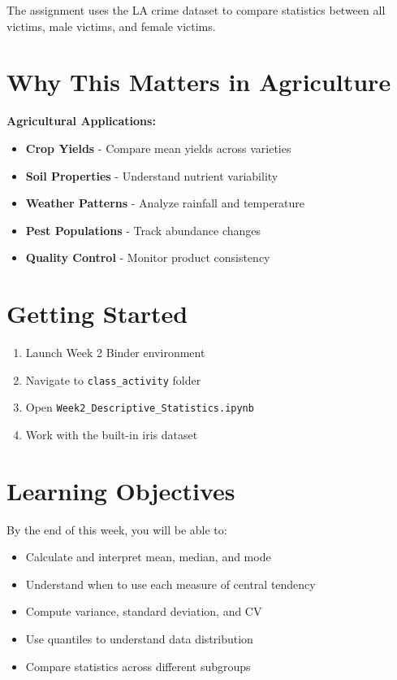 \documentclass[11pt,a4paper]{article}
\begin{document}
The assignment uses the LA crime dataset to compare statistics between all victims, male victims, and female victims.

\section{Why This Matters in Agriculture}

\begin{infobox}
\textbf{Agricultural Applications:}
\begin{itemize}
    \item \textbf{Crop Yields} - Compare mean yields across varieties
    \item \textbf{Soil Properties} - Understand nutrient variability
    \item \textbf{Weather Patterns} - Analyze rainfall and temperature
    \item \textbf{Pest Populations} - Track abundance changes
    \item \textbf{Quality Control} - Monitor product consistency
\end{itemize}
\end{infobox}

\section{Getting Started}

\begin{enumerate}
    \item Launch Week 2 Binder environment
    \item Navigate to \texttt{class\_activity} folder
    \item Open \texttt{Week2\_Descriptive\_Statistics.ipynb}
    \item Work with the built-in iris dataset
\end{enumerate}

\section{Learning Objectives}

By the end of this week, you will be able to:
\begin{itemize}
    \item Calculate and interpret mean, median, and mode
    \item Understand when to use each measure of central tendency
    \item Compute variance, standard deviation, and CV
    \item Use quantiles to understand data distribution
    \item Compare statistics across different subgroups
\end{itemize}
\end{document}
